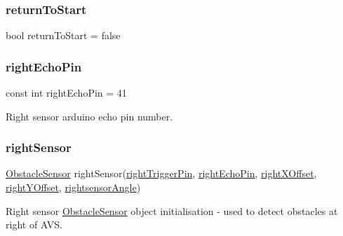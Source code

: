 \subsubsection{\texorpdfstring{return\+To\+Start}{returnToStart}}
{\footnotesize\ttfamily bool return\+To\+Start = false}

\mbox{\label{bot_main_8ino_a922d02edb9759eb944c27cebb4a448cb}} 
\subsubsection{\texorpdfstring{right\+Echo\+Pin}{rightEchoPin}}
{\footnotesize\ttfamily const int right\+Echo\+Pin = 41}



Right sensor arduino echo pin number. 

\mbox{\label{bot_main_8ino_a4b08258caa24173f4153413d596aea69}} 
\subsubsection{\texorpdfstring{right\+Sensor}{rightSensor}}
{\footnotesize\ttfamily \mbox{\hyperlink{class_obstacle_sensor}{Obstacle\+Sensor}} right\+Sensor(\mbox{\hyperlink{bot_main_8ino_ad7785c889e9d6290073148f74ce9de5e}{right\+Trigger\+Pin}}, \mbox{\hyperlink{bot_main_8ino_a922d02edb9759eb944c27cebb4a448cb}{right\+Echo\+Pin}}, \mbox{\hyperlink{bot_main_8ino_ac932cddb5bc68094c96d0034c92faef9}{right\+X\+Offset}}, \mbox{\hyperlink{bot_main_8ino_a07903b96b48e8e456debd9cc43c7af05}{right\+Y\+Offset}}, \mbox{\hyperlink{bot_main_8ino_a83724535498f068d5b44150a2bc4fcf8}{rightsensor\+Angle}})}



Right sensor \mbox{\hyperlink{class_obstacle_sensor}{Obstacle\+Sensor}} object initialisation -\/ used to detect obstacles at right of A\+VS. 

\mbox{\label{bot_main_8ino_a83724535498f068d5b44150a2bc4fcf8}} 
